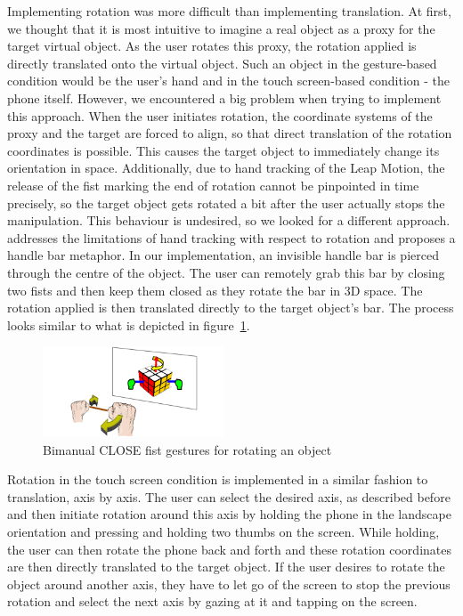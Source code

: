 Implementing rotation was more difficult than implementing translation. At first, we thought that it is most intuitive to imagine a real object as a proxy for the target virtual object. As the user rotates this proxy, the rotation applied is directly translated onto the virtual object. Such an object in the gesture-based condition would be the user's hand and in the touch screen-based condition - the phone itself. However, we encountered a big problem when trying to implement this approach. When the user initiates rotation, the coordinate systems of the proxy and the target are forced to align, so that direct translation of the rotation coordinates is possible. This causes the target object to immediately change its orientation in space. Additionally, due to hand tracking of the Leap Motion, the release of the fist marking the end of rotation cannot be pinpointed in time precisely, so the target object gets rotated a bit after the user actually stops the manipulation. This behaviour is undesired, so we looked for a different approach. \cite{song2012} addresses the limitations of hand tracking with respect to rotation and proposes a handle bar metaphor. In our implementation, an invisible handle bar is pierced through the centre of the object. The user can remotely grab this bar by closing two fists and then keep them closed as they rotate the bar in 3D space. The rotation applied is then translated directly to the target object's bar. The process looks similar to what is depicted in figure~\ref{handle}.

\begin{figure}
\includegraphics[width=0.48\textwidth]{handlebar}
\caption{
\textsf{Bimanual CLOSE fist gestures for rotating an object~\cite[p.~1302]{song2012}}
}
\label{handle}
\end{figure}

Rotation in the touch screen condition is implemented in a similar fashion to translation, axis by axis. The user can select the desired axis, as described before and then initiate rotation around this axis by holding the phone in the landscape orientation and pressing and holding two thumbs on the screen. While holding, the user can then rotate the phone back and forth and these rotation coordinates are then directly translated to the target object. If the user desires to rotate the object around another axis, they have to let go of the screen to stop the previous rotation and select the next axis by gazing at it and tapping on the screen.
